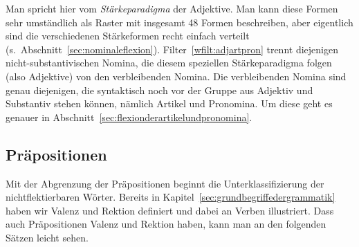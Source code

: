 \begin{exe}
  \ex\label{ex:adjektive031}
  \begin{xlist}
  \end{xlist}
  \ex\label{ex:adjektive032}
  \begin{xlist}
  \end{xlist}
\end{exe}

Man spricht hier vom \textit{Stärkeparadigma} der Adjektive.
Man kann diese Formen sehr umständlich als Raster mit insgesamt 48 Formen beschreiben, aber eigentlich sind die verschiedenen Stärkeformen recht einfach verteilt (s.\ Abschnitt~\ref{sec:nominaleflexion}).
Filter~\ref{wfilt:adjartpron} trennt diejenigen nicht-substantivischen Nomina, die diesem speziellen Stärkeparadigma folgen (also Adjektive) von den verbleibenden Nomina.
Die verbleibenden Nomina sind genau diejenigen, die syntaktisch noch vor der Gruppe aus Adjektiv und Substantiv stehen können, nämlich Artikel und Pronomina.
Um diese geht es genauer in Abschnitt~\ref{sec:flexionderartikelundpronomina}.


\subsection{Präpositionen}
\label{sec:praepositionen}


Mit der Abgrenzung der Präpositionen beginnt die Unterklassifizierung der nichtflektierbaren Wörter.
Bereits in Kapitel~\ref{sec:grundbegriffedergrammatik} haben wir Valenz und Rektion definiert und dabei an Verben illustriert.
Dass auch Präpositionen Valenz und Rektion haben, kann man an den folgenden Sätzen leicht sehen.

\begin{exe}
  \ex
  \begin{xlist}
  \end{xlist}
\end{exe}

